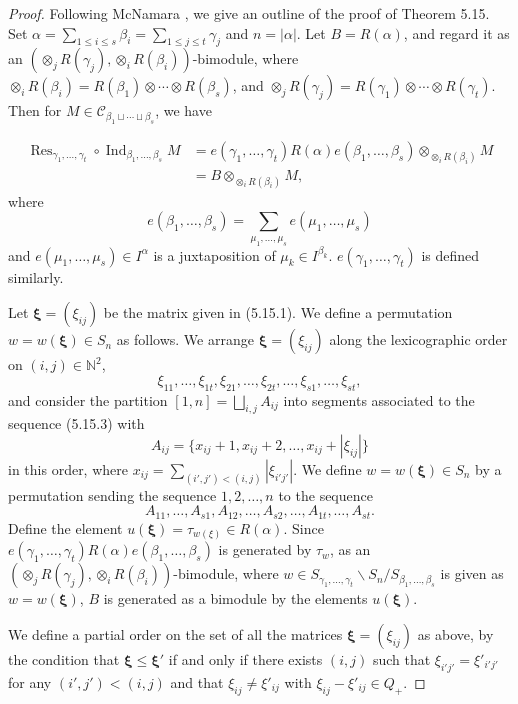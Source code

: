 \documentclass[12pt]{amsart}
\renewcommand\a{\alpha}
\renewcommand\b{\beta}
\newcommand\g{\gamma}
\renewcommand\t{\tau}
\renewcommand{\1}{\mathbb 1}
\newcommand{\NN}{\mathbb N}
\newcommand\Bxi{\boldsymbol\xi}
\newcommand\SC{\mathscr{C}}
\newcommand\Ind{\operatorname{Ind}}
\newcommand\Res{\operatorname{Res}}
\numberwithin{equation}{section}
\begin{document}
\begin{proof}
Following McNamara \cite{M}, we give an outline of the proof of Theorem 5.15.
Set $\a = \sum_{1 \le i \le s}\b_i = \sum_{1 \le j \le t}\g_j$ and $n = |\a|$.
Let $B = R(\a)$, and regard it as an
$(\otimes_jR(\g_j), \otimes_iR(\b_i))$-bimodule,
where $\otimes_iR(\b_i) = R(\b_1)\otimes \cdots \otimes R(\b_s)$, and
$\otimes_jR(\g_j) = R(\g_1)\otimes\cdots\otimes R(\g_t)$. 
Then for $M \in \SC_{\b_1\sqcup\cdots\sqcup\b_s}$, we have

\begin{align*}
  \Res_{\g_1, \dots,\g_t}\circ \Ind_{\b_1, \dots,\b_s}M
  &=  e(\g_1,\dots, \g_t)R(\a)e(\b_1,\dots, \b_s)
             \otimes_{\otimes_iR(\b_i)}M  \\
  &= B \otimes_{\otimes_iR(\b_i)}M,
\end{align*}
where
\begin{equation*}
e(\b_1, \dots, \b_s) = \sum_{\mu_1, \dots, \mu_s} e(\mu_1, \dots, \mu_s)
\end{equation*}
and $e(\mu_1, \dots, \mu_s) \in I^{\a}$ is a juxtaposition of
$\mu_k \in I^{\b_k}$.  $e(\g_1, \dots, \g_t)$ is defined similarly. 
\par
Let $\Bxi = (\xi_{ij})$ be the matrix given in (5.15.1).
We define a permutation $w = w(\Bxi) \in S_n$
as follows.
We arrange $\Bxi = (\xi_{ij})$ along the lexicographic order on $(i,j) \in \NN^2$,
\begin{equation*}
\tag{5.15.3}  
\xi_{11}, \dots, \xi_{1t}, \xi_{21}, \dots, \xi_{2t}, \dots, \xi_{s1}, \dots, \xi_{st},
\end{equation*}
and consider the partition $[1,n] = \bigsqcup_{i,j}A_{ij}$ into segments
associated to the sequence (5.15.3) with
\begin{equation*}
  A_{ij} = \{ x_{ij} +1, x_{ij}+ 2, \dots, x_{ij} + |\xi_{ij}|\}
\end{equation*}
in this order,
where $x_{ij} = \sum_{(i',j') < (i,j)}|\xi_{i'j'}|$.
We define $w = w(\Bxi) \in S_n$ by
a permutation sending the sequence $1,2, \dots, n$ to the sequence
\begin{equation*}
  A_{11}, \dots, A_{s1}, A_{12}, \dots, A_{s2},
       \dots, A_{1t}, \dots, A_{st}.
\end{equation*}
Define the element $u(\Bxi) = \tau_{w(\xi)} \in R(\a)$. 
Since $e(\g_1,\dots, \g_t)R(\a)e(\b_1, \dots, \b_s)$ is generated
by $\t_w$, as an $(\otimes_jR(\g_j), \otimes_iR(\b_i))$-bimodule, 
where
$w \in S_{\g_1, \dots, \g_t}\backslash S_n/S_{\b_1, \dots, \b_s}$
is given as $w = w(\Bxi)$,  
$B$ is generated as a bimodule by the elements $u(\Bxi)$.
\par
We define a partial order on the set of all the matrices $\Bxi = (\xi_{ij})$
as above, by the condition that   
$\Bxi \le \Bxi'$ if and only if there exists $(i,j)$ such that
$\xi_{i'j'} = \xi'_{i'j'}$
for any $(i',j') < (i,j)$ and that $\xi_{ij} \ne \xi'_{ij}$ with 
$\xi_{ij} - \xi'_{ij} \in Q_+$.


\end{proof}
\end{document}
